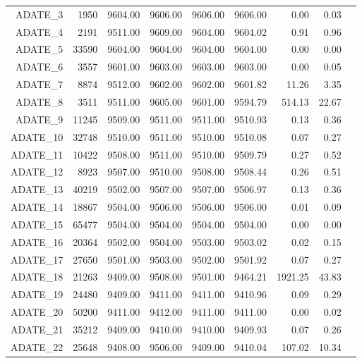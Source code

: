 \begin{longtable}{|rrrrrrrrr|}
	ADATE\_3  &  1950  &  9604.00  &  9606.00  &  9606.00  &  9606.00  &  0.00  &  0.03 & \\
	ADATE\_4  &  2191  &  9511.00  &  9609.00  &  9604.00  &  9604.02  &  0.91  &  0.96 & \\
	ADATE\_5  &  33590  &  9604.00  &  9604.00  &  9604.00  &  9604.00  &  0.00  &  0.00 & \\
	ADATE\_6  &  3557  &  9601.00  &  9603.00  &  9603.00  &  9603.00  &  0.00  &  0.05 & \\
	ADATE\_7  &  8874  &  9512.00  &  9602.00  &  9602.00  &  9601.82  &  11.26  &  3.35 & \\
	ADATE\_8  &  3511  &  9511.00  &  9605.00  &  9601.00  &  9594.79  &  514.13  &  22.67 & \\
	ADATE\_9  &  11245  &  9509.00  &  9511.00  &  9511.00  &  9510.93  &  0.13  &  0.36 & \\
	ADATE\_10  &  32748  &  9510.00  &  9511.00  &  9510.00  &  9510.08  &  0.07  &  0.27 & \\
	ADATE\_11  &  10422  &  9508.00  &  9511.00  &  9510.00  &  9509.79  &  0.27  &  0.52 & \\
	ADATE\_12  &  8923  &  9507.00  &  9510.00  &  9508.00  &  9508.44  &  0.26  &  0.51 & \\
	ADATE\_13  &  40219  &  9502.00  &  9507.00  &  9507.00  &  9506.97  &  0.13  &  0.36 & \\
	ADATE\_14  &  18867  &  9504.00  &  9506.00  &  9506.00  &  9506.00  &  0.01  &  0.09 & \\
	ADATE\_15  &  65477  &  9504.00  &  9504.00  &  9504.00  &  9504.00  &  0.00  &  0.00 & \\
	ADATE\_16  &  20364  &  9502.00  &  9504.00  &  9503.00  &  9503.02  &  0.02  &  0.15 & \\
	ADATE\_17  &  27650  &  9501.00  &  9503.00  &  9502.00  &  9501.92  &  0.07  &  0.27 & \\
	ADATE\_18  &  21263  &  9409.00  &  9508.00  &  9501.00  &  9464.21  &  1921.25  &  43.83 & \\
	ADATE\_19  &  24480  &  9409.00  &  9411.00  &  9411.00  &  9410.96  &  0.09  &  0.29 & \\
	ADATE\_20  &  50200  &  9411.00  &  9412.00  &  9411.00  &  9411.00  &  0.00  &  0.02 & \\
	ADATE\_21  &  35212  &  9409.00  &  9410.00  &  9410.00  &  9409.93  &  0.07  &  0.26 & \\
	ADATE\_22  &  25648  &  9408.00  &  9506.00  &  9409.00  &  9410.04  &  107.02  &  10.34 & \\

\end{longtable}
